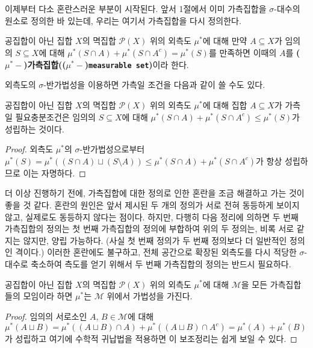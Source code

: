 이제부터 다소 혼란스러운 부분이 시작된다. 앞서 1절에서 이미 가측집합을 $\sigma$-대수의 원소로 정의한 바 있는데, 우리는 여기서 가측집합을 다시 정의한다.

\begin{definition}\label{def:measurable2}
    공집합이 아닌 집합 $X$의 멱집합 $\mathcal{P}(X)$ 위의 외측도 $\mu^*$에 대해 만약 $A\subseteq X$가 임의의 $S\subseteq X$에 대해 $\mu^*(S\cap A)+\mu^*(S\cap A^c)=\mu^*(S)$를 만족하면 이때의 $A$를 \textbf{($\mu^*-$)가측집합(($\mu^*-$)\texttt{measurable set})}이라 한다.
\end{definition}

외측도의 $\sigma$-반가법성을 이용하면 가측일 조건을 다음과 같이 쓸 수도 있다.

\begin{proposition}\label{prop:measurable}
    공집합이 아닌 집합 $X$의 멱집합 $\mathcal{P}(X)$ 위의 외측도 $\mu^*$에 대해 집합 $A\subseteq X$가 가측일 필요충분조건은 임의의 $S\subseteq X$에 대해 $\mu^*(S\cap A)+\mu^*(S\cap A^c)\leq\mu^*(S)$가 성립하는 것이다.
\end{proposition}

\begin{proof}
    외측도 $\mu^*$의 $\sigma$-반가법성으로부터 $\mu^*(S)=\mu^*((S\cap A)\sqcup(S\setminus A))\leq\mu^*(S\cap A)+\mu^*(S\cap A^c)$가 항상 성립하므로 이는 자명하다.
\end{proof}

더 이상 진행하기 전에, 가측집합에 대한 정의로 인한 혼란을 조금 해결하고 가는 것이 좋을 것 같다. 혼란의 원인은 앞서 제시된 두 개의 정의가 서로 전혀 동등하게 보이지 않고, 실제로도 동등하지 않다는 점이다. 하지만, 다행히 다음 정리에 의하면 두 번째 가측집합의 정의는 첫 번째 가측집합의 정의에 부합하여 위의 두 정의는, 비록 서로 같지는 않지만, 양립 가능하다. (사실 첫 번째 정의가 두 번째 정의보다 더 일반적인 정의인 격이다.) 이러한 혼란에도 불구하고, 전체 공간으로 확장된 외측도를 다시 적당한 $\sigma$-대수로 축소하여 측도를 얻기 위해서 두 번째 가측집합의 정의는 반드시 필요하다.

\begin{lemma}\label{lem:outerMeasureSigmaAlgebra}
    공집합이 아닌 집합 $X$의 멱집합 $\mathcal{P}(X)$ 위의 외측도 $\mu^*$에 대해 $\mathcal{M}$을 모든 가측집합들의 모임이라 하면 $\mu^*$는 $\mathcal{M}$ 위에서 가법성을 가진다.
\end{lemma}

\begin{proof}
    임의의 서로소인 $A,\,B\in\mathcal{M}$에 대해 $\mu^*(A\sqcup B)=\mu^*((A\sqcup B)\cap A)+\mu^*((A\sqcup B)\cap A^c)=\mu^*(A)+\mu^*(B)$가 성립하고 여기에 수학적 귀납법을 적용하면 이 보조정리는 쉽게 보일 수 있다.
\end{proof}

